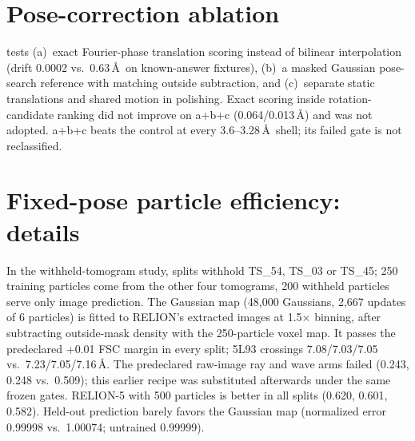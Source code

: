 





\section{Pose-correction ablation}
\label{sec:suppl:ablation}



 tests (a)~exact Fourier-phase translation scoring instead of bilinear interpolation (drift 0.0002 vs.\ 0.63\,\AA\ on known-answer fixtures), (b)~a masked Gaussian pose-search reference with matching outside subtraction, and (c)~separate static translations and shared motion in polishing.
Exact scoring inside rotation-candidate ranking did not improve on a+b+c (0.064/0.013\,\AA) and was not adopted.
a+b+c beats the control at every 3.6--3.28\,\AA\ shell; its failed gate is not reclassified.

\section{Fixed-pose particle efficiency: details}
\label{sec:suppl:efficiency}

In the withheld-tomogram study, splits withhold TS\_54, TS\_03 or TS\_45; 250 training particles come from the other four tomograms, 200 withheld particles serve only image prediction.
The Gaussian map (48,000 Gaussians, 2,667 updates of 6 particles) is fitted to RELION's extracted images at 1.5$\times$ binning, after subtracting outside-mask density with the 250-particle voxel map.
It passes the predeclared +0.01 FSC margin in every split; 5L93 crossings 7.08/7.03/7.05 vs.\ 7.23/7.05/7.16\,\AA.
The predeclared raw-image ray and wave arms failed (0.243, 0.248 vs.\ 0.509); this earlier recipe was substituted afterwards under the same frozen gates.
RELION-5 with 500 particles is better in all splits (0.620, 0.601, 0.582).
Held-out prediction barely favors the Gaussian map (normalized error 0.99998 vs.\ 1.00074; untrained 0.99999).

